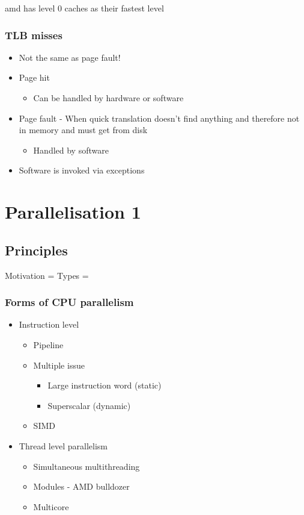 \documentclass{article}
\begin{document}
		amd has level 0 caches as their fastest level
		\subsubsection{TLB misses}
		\begin{itemize}
			\item Not the same as page fault!
			
			\item Page hit
			\begin{itemize}
				\item Can be handled by hardware or software
			\end{itemize}
			
			\item Page fault - When quick translation doesn't find anything and therefore not in memory and must get from disk
			\begin{itemize}
				\item Handled by software
			\end{itemize}
			
			\item Software is invoked via exceptions
		\end{itemize}

\section{Parallelisation 1}
	\subsection{Principles}
		Motivation = 
		Types =

		\subsubsection{Forms of CPU parallelism}
		\begin{itemize}
			\item Instruction level
			\begin{itemize}
				\item Pipeline
				\item Multiple issue
				\begin{itemize}
					\item Large instruction word (static)
					\item Superscalar (dynamic)
				\end{itemize}
				\item SIMD
			\end{itemize}
			\item Thread level parallelism
			\begin{itemize}
				\item Simultaneous multithreading
				\item Modules - AMD bulldozer
				\item Multicore
			\end{itemize}
		\end{itemize}
\end{document}
